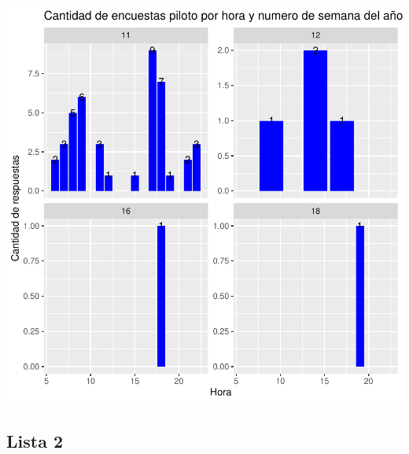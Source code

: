 \documentclass{article}
\begin{document}
\includegraphics{seguimientov5-008}

\subsection{Lista 2}
\end{document}
